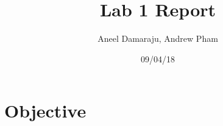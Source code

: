 \documentclass[12pt]{article} %
\title{Lab 1 Report}
\author{Aneel Damaraju, Andrew Pham}
\date{09/04/18}
\begin{document}
	\maketitle
	\section{Objective}
	
\end{document}
